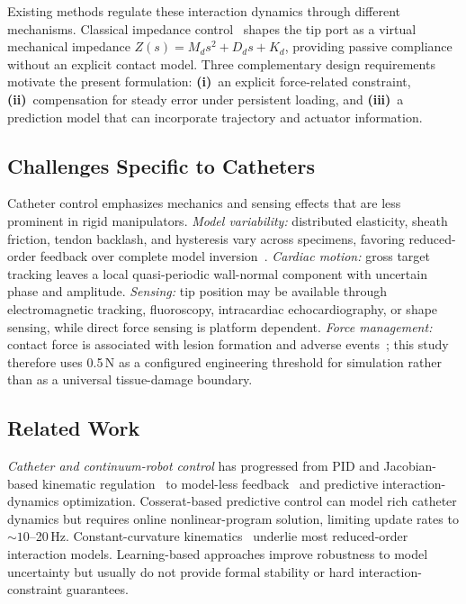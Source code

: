 Existing methods regulate these interaction dynamics through different mechanisms. Classical impedance control~\cite{hogan1985} shapes the 
tip port as a virtual mechanical impedance $Z(s) = M_d s^2 + D_d s + K_d$, providing passive compliance without an explicit contact model. 
Three complementary design requirements motivate the present formulation: \textbf{(i)}~an explicit force-related constraint, 
\textbf{(ii)}~compensation for steady error under persistent loading, and \textbf{(iii)}~a prediction model that can incorporate 
trajectory and actuator information.

\subsection{Challenges Specific to Catheters}

Catheter control emphasizes mechanics and sensing effects that are less prominent in rigid manipulators. \emph{Model variability:} distributed elasticity, sheath friction, tendon backlash, and hysteresis vary across specimens, favoring reduced-order feedback over complete model inversion~\cite{antman1995,rucker2011}. \emph{Cardiac motion:} gross target tracking leaves a local quasi-periodic wall-normal component with uncertain phase and amplitude. \emph{Sensing:} tip position may be available through electromagnetic tracking, fluoroscopy, intracardiac echocardiography, or shape sensing, while direct force sensing is platform dependent. \emph{Force management:} contact force is associated with lesion formation and adverse events~\cite{yokoyama2008}; this study therefore uses 0.5\,N as a configured engineering threshold for simulation rather than as a universal tissue-damage boundary.

\subsection{Related Work}

\emph{Catheter and continuum-robot control} has progressed from PID and Jacobian-based kinematic regulation~\cite{camarillo2008,yip2014} to model-less feedback~\cite{yip2014} and predictive interaction-dynamics optimization. Cosserat-based predictive control can model rich catheter dynamics but requires online nonlinear-program solution, limiting update rates to ${\sim}10$--20\,Hz. Constant-curvature kinematics~\cite{webster2010} underlie most reduced-order interaction models. Learning-based approaches improve robustness to model uncertainty but usually do not provide formal stability or hard interaction-constraint guarantees.

